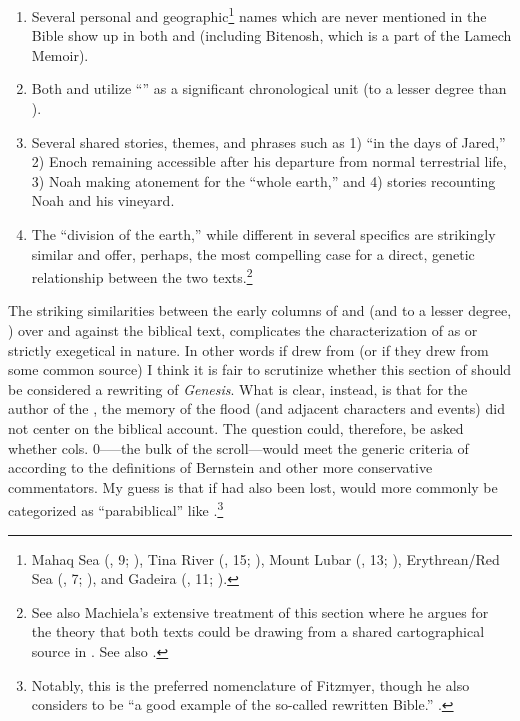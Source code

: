 \begin{enumerate}
    \item Several personal and geographic\footnote{%
        Mahaq Sea (, 9; ), Tina River (, 15; ), Mount Lubar (, 13; ), Erythrean/Red Sea (, 7; ), and Gadeira (, 11; ).}%
        names which are never mentioned in the Bible show up in both \ga and \jub (including Bitenosh, which is a part of the Lamech Memoir).
    \item Both \jub and \ga utilize ``\jub'' as a significant chronological unit (\ga to a lesser degree than \jub).
    \item Several shared stories, themes, and phrases such as 1) ``in the days of Jared,'' 2) Enoch remaining accessible after his departure from normal terrestrial life, 3) Noah making atonement for the ``whole earth,'' and 4) stories recounting Noah and his vineyard.
    \item The ``division of the earth,'' while different in several specifics are strikingly similar and offer, perhaps, the most compelling case for a direct, genetic relationship between the two texts.\footnote{See also Machiela's extensive treatment of this section where he argues for the theory that both texts could be drawing from a shared cartographical source in \cite*[105--130]{machiela2009}. See also \cite{alexander_jjs1982}.}
\end{enumerate}

The striking similarities between the early columns of \ga and \jub (and to a lesser degree, \firstenoch) over and against the biblical text, complicates the characterization of \ga as \rwb or strictly exegetical in nature. In other words if \ga drew from \jub (or if they drew from some common source) I think it is fair to scrutinize whether this section of \ga should be considered a rewriting of \emph{Genesis}. What is clear, instead, is that for the author of the \ga, the memory of the flood (and adjacent characters and events) did not center on the biblical account. The question could, therefore, be asked whether cols. 0-----the bulk of the scroll---would meet the generic criteria of \rwb according to the definitions of Bernstein and other more conservative commentators. My guess is that if  had also been lost, \ga would more commonly be categorized as ``parabiblical'' like \firstenoch.\footnote{Notably, this is the preferred nomenclature of Fitzmyer, though he also considers \ga to be ``a good example of the so-called rewritten Bible.'' \cite[20]{fitzmyer2004}.}

